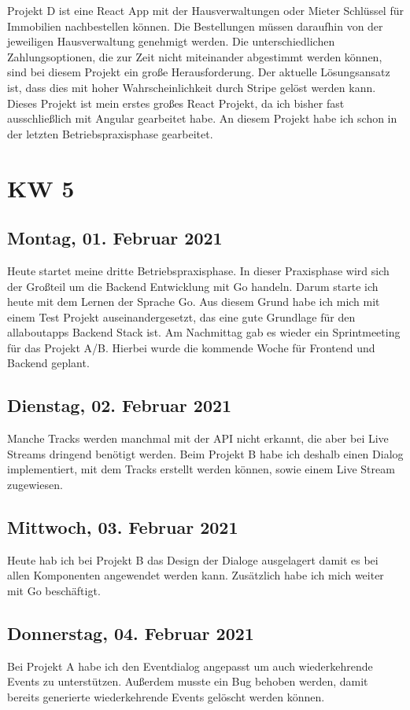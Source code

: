 Projekt D ist eine React App mit der Hausverwaltungen oder Mieter Schlüssel für Immobilien nachbestellen können. Die Bestellungen müssen daraufhin von der jeweiligen Hausverwaltung genehmigt werden. Die unterschiedlichen Zahlungsoptionen, die zur Zeit nicht miteinander abgestimmt werden können, sind bei diesem Projekt ein große Herausforderung. Der aktuelle Lösungsansatz ist, dass dies mit hoher Wahrscheinlichkeit durch Stripe gelöst werden kann. Dieses Projekt ist mein erstes großes React\cite{react} Projekt, da ich bisher fast ausschließlich mit Angular gearbeitet habe. An diesem Projekt habe ich schon in der letzten Betriebspraxisphase gearbeitet.


\chapter{KW 5}

\section{Montag, 01. Februar 2021}
Heute startet meine dritte Betriebspraxisphase. In dieser Praxisphase wird sich der Großteil um die Backend Entwicklung mit Go\cite{gostarter}\cite{go} handeln. Darum starte ich heute mit dem Lernen der Sprache Go. Aus diesem Grund habe ich mich mit einem Test Projekt\cite{beerPunk} auseinandergesetzt, das eine gute Grundlage für den allaboutapps Backend Stack ist. Am Nachmittag gab es wieder ein Sprintmeeting für das Projekt A/B. Hierbei wurde die kommende Woche für Frontend und Backend geplant.

\section{Dienstag, 02. Februar 2021}
Manche Tracks werden manchmal mit der API nicht erkannt, die aber bei Live Streams dringend benötigt werden. Beim Projekt B habe ich deshalb einen Dialog implementiert, mit dem Tracks erstellt werden können, sowie einem Live Stream zugewiesen. 

\section{Mittwoch, 03. Februar 2021}
Heute hab ich bei Projekt B das Design der Dialoge ausgelagert damit es bei allen Komponenten angewendet werden kann. Zusätzlich habe ich mich weiter mit Go beschäftigt.

\section{Donnerstag, 04. Februar 2021}
Bei Projekt A habe ich den Eventdialog angepasst um auch wiederkehrende Events zu unterstützen. Außerdem musste ein Bug behoben werden, damit bereits generierte wiederkehrende Events gelöscht werden können.

